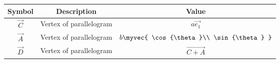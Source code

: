  \begin{tabular}{|c|c|c|}
    \hline
        \textbf{Symbol} &\textbf{Description}&\textbf{Value}  \\
        \hline
  $\vec{C}$&Vertex of parallelogram &$a\vec{e_1}$\\
        \hline
         $\vec{A}$&Vertex of parallelogram &$b\myvec{
             \cos{\theta}\\
             \sin{\theta}
         }$\\
        \hline
        $\vec{D}$&Vertex of parallelogram &$\vec{C+A}$\\
        \hline
    \end{tabular}

